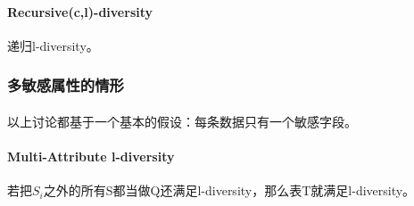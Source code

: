 \documentclass[12pt,a4paper]{article}
\begin{document}
\paragraph{Recursive(c,l)-diversity} 递归l-diversity。 

\subsubsection{多敏感属性的情形}
\paragraph{} 以上讨论都基于一个基本的假设：每条数据只有一个敏感字段。
\paragraph{Multi-Attribute l-diversity} 若把$S_i$之外的所有S都当做Q还满足l-diversity，那么表T就满足l-diversity。



\end{document}
